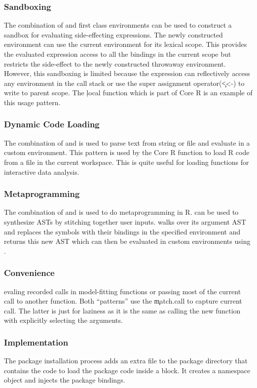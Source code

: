\documentclass[conference]{IEEEtran}
\begin{document}
  \subsubsection{Sandboxing} The combination of \eval and first class
  environments can be used to construct a sandbox for evaluating side-effecting
  expressions. The newly constructed environment can use the current environment
  for its lexical scope. This provides the evaluated expression access to all the
  bindings in the current scope but restricts the side-effect to the newly
  constructed throwaway environment. However, this sandboxing is limited because
  the expression can reflectively access any environment in the call stack or use
  the super assignment operator(\c{<<-}) to write to parent scope. The \c{local}
  function which is part of Core R is an example of this usage pattern.

  \subsubsection{Dynamic Code Loading} The combination of \parse and \eval is
  used to parse text from string or file and evaluate in a custom environment.
  This pattern is used by the \source Core R function to load R code from a file
  in the current workspace. This is quite useful for loading functions for
  interactive data analysis.

  \subsubsection{Metaprogramming} The combination of \eval and \substitute is
  used to do metaprogramming in R. \substitute can be used to synthesize ASTs by
  stitching together user inputs. \substitute walks over its argument AST and
  replaces the symbols with their bindings in the specified environment and
  returns this new AST which can then be evaluated in custom environments using
  \eval.

  \subsubsection{Convenience}
  evaling recorded calls in model-fitting functions or passing most of the
  current call to another function. Both ``patterns'' use the \c{match.call} to
  capture current call. The latter is just for laziness as it is the same as
  calling the new function with explicitly selecting the arguments.

  \subsubsection{Implementation}
  The package installation process adds an extra file to the package directory
  that contains the code to load the package code inside a \local block. It
  creates a namespace object and injects the package bindings.
\end{document}
